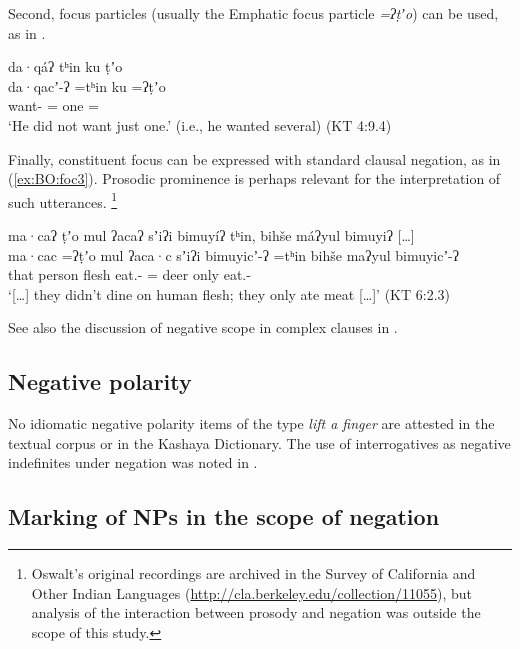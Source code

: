 \documentclass[output=paper,modfonts,nonflat,colorlinks,citecolor=brown]{langscibook}
\begin{document}
Second, focus particles (usually the Emphatic focus particle \textit{=ʔṭʼo}) can be used, as in .
    

\ea \label{ex:BO:45}
\glll da·qáʔ tʰin ku ṭʼo\\
    da·qacʼ-ʔ =tʰin ku =ʔṭʼo\\
    want- = one =\\
\glt `He did not want just one.' (i.e., he wanted several) ({KT 4:9.4})\\
\z
    
Finally, constituent focus can be expressed with standard clausal negation, as in (\ref{ex:BO:foc3}). Prosodic prominence is perhaps relevant for the interpretation of such utterances.%
\footnote{Oswalt's original recordings are archived in the Survey of California and Other Indian Languages (\url{http://cla.berkeley.edu/collection/11055}), but analysis of the interaction between prosody and negation was outside the scope of this study.}

\ea 
\label{ex:BO:foc3}
\glll [\ldots] ma·caʔ ṭʼo mul ʔacaʔ sʼiʔi bimuyíʔ tʰin, bihše máʔyul bimuyiʔ [\ldots]\\
    {} ma·cac =ʔṭʼo mul ʔaca·c sʼiʔi bimuyicʼ-ʔ =tʰin bihše maʔyul bimuyicʼ-ʔ {}\\
    {}   that person flesh eat.- = deer only eat.-\\
\glt `[\ldots] they didn’t dine on human flesh; they only ate meat [\ldots]' ({KT 6:2.3})\\
\z

See also the discussion of negative scope in complex clauses in .

\subsection{Negative polarity}

No idiomatic negative polarity items of the type \textit{lift a finger} are attested in the textual corpus or in the Kashaya Dictionary.
The use of interrogatives as negative indefinites under negation was noted in .

\subsection{Marking of NPs in the scope of negation}
\end{document}

